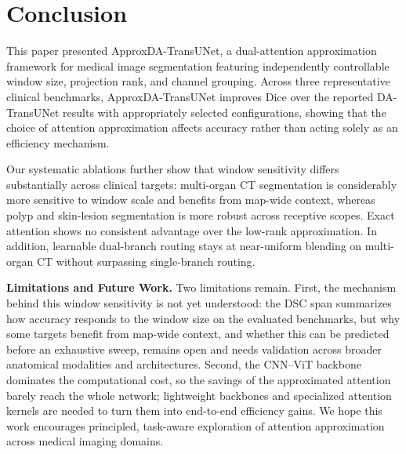 \section{Conclusion}
\label{sec:conclusion}
This paper presented ApproxDA-TransUNet, a dual-attention approximation framework for medical image segmentation featuring independently controllable window size, projection rank, and channel grouping. Across three representative clinical benchmarks, ApproxDA-TransUNet improves Dice over the reported DA-TransUNet results with appropriately selected configurations, showing that the choice of attention approximation affects accuracy rather than acting solely as an efficiency mechanism.

Our systematic ablations further show that window sensitivity differs substantially across clinical targets: multi-organ CT segmentation is considerably more sensitive to window scale and benefits from map-wide context, whereas polyp and skin-lesion segmentation is more robust across receptive scopes. Exact attention shows no consistent advantage over the low-rank approximation. In addition, learnable dual-branch routing stays at near-uniform blending on multi-organ CT without surpassing single-branch routing.

\textbf{Limitations and Future Work.} Two limitations remain. First, the mechanism behind this window sensitivity is not yet understood: the DSC span summarizes how accuracy responds to the window size on the evaluated benchmarks, but why some targets benefit from map-wide context, and whether this can be predicted before an exhaustive sweep, remains open and needs validation across broader anatomical modalities and architectures. Second, the CNN--ViT backbone dominates the computational cost, so the savings of the approximated attention barely reach the whole network; lightweight backbones and specialized attention kernels are needed to turn them into end-to-end efficiency gains. We hope this work encourages principled, task-aware exploration of attention approximation across medical imaging domains.
